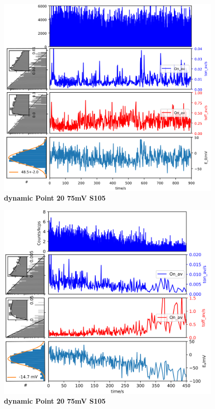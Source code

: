 \begin{figure}
  \centering
  \includegraphics[width=\textwidth]{dynamic_Point_20_75mV_S105}
  \caption{\textbf{dynamic Point 20 75mV S105}}
  \label{SIfig:dynamic_Point_20_75mV_S105}
\end{figure}
\begin{figure}
  \centering
  \includegraphics[width=\textwidth]{dynamic_Point_21_75mV_S105}
  \caption{\textbf{dynamic Point 20 75mV S105}}
  \label{SIfig:dynamic_Point_21_75mV_S105}
\end{figure}
